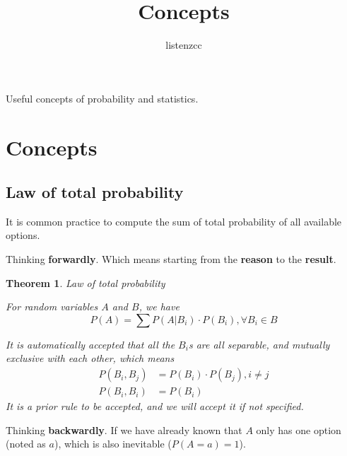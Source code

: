 

\newtheorem{theorem}{Theorem}[section]
\newtheorem{lemma}{Lemma}[section]
\newtheorem{proposition}{Proposition}[section]

\title{Concepts}
\author{listenzcc}



\maketitle

\abstract
Useful concepts of probability and statistics.

\tableofcontents

\section{Concepts}

\subsection{Law of total probability}

It is common practice to compute the sum of total probability of all available options.

Thinking \textbf{forwardly}.
Which means starting from the \textbf{reason} to the \textbf{result}.

\begin{theorem}
    \label{Theroem: Law of total probability}
    Law of total probability

    For random variables $A$ and $B$, we have
    \begin{equation*}
        P(A) = \sum {P(A|B_i) \cdot P(B_i)}, \forall B_i \in B
    \end{equation*}

    It is automatically accepted that all the $B_i$s are all separable, and mutually exclusive with each other, which means
    \begin{align*}
        P(B_i, B_j) & = P(B_i) \cdot P(B_j), i \neq j \\
        P(B_i, B_i) & = P(B_i)
    \end{align*}
    It is a prior rule to be accepted, and we will accept it if not specified.
\end{theorem}

Thinking \textbf{backwardly}.
If we have already known that $A$ only has one option (noted as $a$), which is also inevitable ($P(A=a) = 1$).

